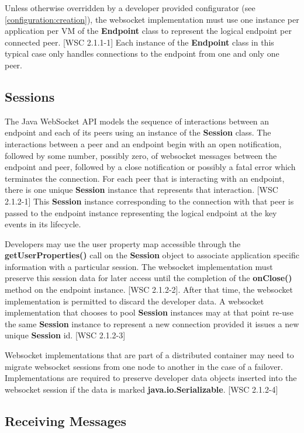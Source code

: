 Unless otherwise overridden by a developer provided configurator (see \ref{configuration:creation}), the websocket implementation must use one instance per application per VM of the \textbf{Endpoint} class to represent the logical endpoint per connected peer. [WSC 2.1.1-1] Each instance of the \textbf{Endpoint} class in this typical case only handles connections to the endpoint from one and only one peer.

\subsection{Sessions}

The Java WebSocket API models the sequence of interactions between an endpoint and each of its peers using an instance of the \textbf{Session} class. The interactions between a peer and an endpoint begin with an open notification, followed by some number, possibly zero, of websocket messages between the endpoint and peer, followed by a close notification or possibly a fatal error which terminates the connection. For each peer that is interacting with an endpoint, there is one unique \textbf{Session} instance that represents that interaction. [WSC 2.1.2-1] This \textbf{Session} instance corresponding to the connection with that peer is passed to the endpoint instance representing the logical endpoint at the key events in its lifecycle.

Developers may use the user property map accessible through the \textbf{getUserProperties()} call on the \textbf{Session} object to associate application specific information with a particular session. The websocket implementation must preserve this session data for later access until the completion of the \textbf{onClose()} method on the endpoint instance. [WSC 2.1.2-2]. After that time, the websocket implementation is permitted to discard the developer data. A websocket implementation that chooses to pool \textbf{Session} instances may at that point re-use the same \textbf{Session} instance to represent a new connection provided it issues a new unique \textbf{Session} id. [WSC 2.1.2-3]

Websocket implementations that are part of a distributed container may need to migrate websocket sessions from one node to another in the case of a failover. Implementations are required to preserve developer data objects inserted into the websocket session if the data is marked \textbf{java.io.Serializable}. [WSC 2.1.2-4]

\subsection{Receiving Messages}


